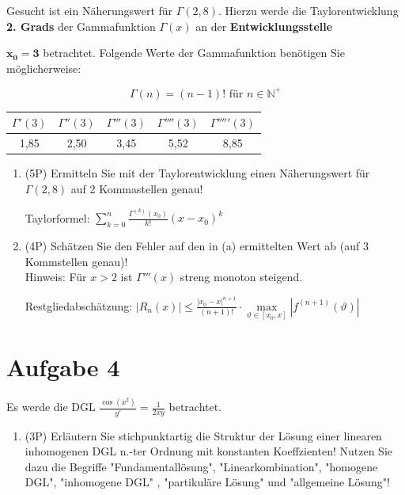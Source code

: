 \documentclass[12pt]{article}
\begin{document}
Gesucht ist ein Näherungswert für $\Gamma(2{,}8)$. Hierzu werde die Taylorentwicklung \textbf{2. Grads} der Gammafunktion $\Gamma(x)$ an der \textbf{Entwicklungsstelle} {$\mathbf{x_0=3}$ betrachtet. Folgende Werte der Gammafunktion benötigen Sie möglicherweise:


$$\Gamma(n) = (n-1)! \text{ für } n \in \mathbb{N}^{+}$$

\begin{center}
\begin{tabular}{ c | c | c | c | c}
 $\Gamma'(3)$ & $\Gamma''(3)$ & $\Gamma'''(3)$ & $\Gamma''''(3)$ & $\Gamma'''''(3)$ \\
 \hline
 1{,}85         &  2{,}50         & 3{,}45           &  5{,}52           & 8{,}85
\end{tabular}
\end{center}

\begin{enumerate}[label=(\alph*)]

\item (5P) Ermitteln Sie mit der Taylorentwicklung einen Näherungswert für $\Gamma(2{,}8)$ auf 2 Kommastellen genau!

Taylorformel: $\sum\limits_{k=0}^n\frac{\Gamma^{(k)}(x_0)}{k!}(x-x_0)^k$

\bigskip
\bigskip
\bigskip
\bigskip
\bigskip
\bigskip
\bigskip
\bigskip
\bigskip
\bigskip
\bigskip
\bigskip
\bigskip
\bigskip
\bigskip
\bigskip
\bigskip

\item (4P) Schätzen Sie den Fehler auf den in (a) ermittelten Wert ab (auf 3 Kommstellen genau)!\\
Hinweis: Für $x>2$ ist $\Gamma'''(x)$ streng monoton steigend.

Restgliedabschätzung: $|R_n(x)| \le \frac{|x_0-x|^{n+1}}{(n+1)!}\cdot\max\limits_{\vartheta\in[x_0,x]} |f^{(n+1)}(\vartheta)|$


\end{enumerate}

\newpage
\section* {Aufgabe 4}

Es werde die DGL $\frac{\cos(x^2)}{y'} = \frac{1}{2xy}$ betrachtet.

\begin{enumerate}[label=(\alph*)]

\item (3P) Erläutern Sie stichpunktartig die Struktur der Lösung einer linearen inhomogenen DGL n.-ter Ordnung mit konstanten Koeffzienten! Nutzen Sie dazu die Begriffe "Fundamentallösung", "Linearkombination", "homogene DGL", "inhomogene DGL" , "partikuläre Lösung" und "allgemeine Lösung"!


\end{enumerate}}
\end{document}
